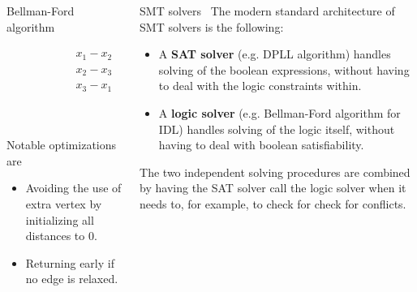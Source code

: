 \documentclass{beamer}
\begin{document}
\begin{frame}[fragile,t]
\begin{columns}[t,onlytextwidth]
\begin{column}{0.485\textwidth}
\begin{block}{Bellman-Ford algorithm~\cite{CLRS}}
			\begin{figure}[h]
				\centering
				\begin{subfigure}{0.3\linewidth}
					\centering
					\begin{align*}
						x_1 - x_2 &\leq 2 \\
						x_2 - x_3 &\leq 1 \\
						x_3 - x_1 &\leq -1 \\
					\end{align*}
				\end{subfigure}
				~
				\begin{subfigure}{0.5\linewidth}
					\centering
				\end{subfigure}
			\end{figure}

			Notable optimizations are
			\begin{itemize}
				\item Avoiding the use of extra vertex by initializing all distances to 0.
				\item Returning early if no edge is relaxed.
			\end{itemize}
		\end{block}
	\end{column}

	\begin{column}{0.485\textwidth}
		\begin{block}{SMT solvers~\cite{slides}}
			The modern standard architecture of SMT solvers is the following:
			\begin{itemize}
				\item A \textbf{SAT solver} (e.g. DPLL algorithm) handles solving of the boolean expressions, without having to deal with the logic constraints within.
				\item A \textbf{logic solver} (e.g. Bellman-Ford algorithm for IDL) handles solving of the logic itself, without having to deal with boolean satisfiability.
			\end{itemize}
			The two independent solving procedures are combined by having the SAT solver call the logic solver when it needs to, for example, to check for check for conflicts.
		\end{block}
	

\end{column}
\end{columns}
\end{frame}
\end{document}
